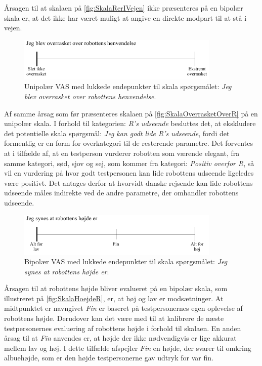 \noindent
%
Årsagen til at skalaen på \autoref{fig:SkalaRerIVejen} ikke præsenteres på en bipolær skala er, at det ikke har været muligt at angive en direkte modpart til at stå i vejen. 
%
\begin{figure}[H]
\centering
\includegraphics[width =\textwidth]{Figure/UdvalgteSkalaer/OverrasketOverR} 
\caption{Unipolær VAS med lukkede endepunkter til skala spørgsmålet: \textit{Jeg blev overrasket over robottens henvendelse}.}
\label{fig:SkalaOverrasketOverR}
\end{figure}
\noindent
%
Af samme årsag som før præsenteres skalaen på \autoref{fig:SkalaOverrasketOverR} på en unipolær skala. \blankline
%
I forhold til kategorien: \textit{R's udseende} besluttes det, at ekskludere det potentielle skala spørgsmål: \textit{Jeg kan godt lide R's udseende}, fordi det formentlig er en form for overkategori til de resterende parametre. Det forventes at i tilfælde af, at en testperson vurderer robotten som værende elegant, fra samme kategori, sød, sjov og sej, som kommer fra kategori: \textit{Positiv overfor R}, så vil en vurdering på hvor godt testpersonen kan lide robottens udseende ligeledes være positivt. Det antages derfor at hvorvidt danske rejsende kan lide robottens udseende måles indirekte ved de andre parametre, der omhandler robottens udseende.
%
\begin{figure}[H]
\centering
\includegraphics[width =\textwidth]{Figure/UdvalgteSkalaer/HoejdeR} 
\caption{Bipolær VAS med lukkede endepunkter til skala spørgsmålet: \textit{Jeg synes at robottens højde er}.}
\label{fig:SkalaHoejdeR}
\end{figure}
\noindent
%
Årsagen til at robottens højde bliver evalueret på en bipolær skala, som illustreret på \autoref{fig:SkalaHoejdeR}, er, at høj og lav er modsætninger. At midtpunktet er navngivet \textit{Fin} er baseret på testpersonernes egen oplevelse af robottens højde. Derudover kan det være med til at kalibrere de næste testpersonernes evaluering af robottens højde i forhold til skalaen. En anden årsag til at \textit{Fin} anvendes er, at højde der ikke nødvendigvis er lige akkurat mellem lav og høj. I dette tilfælde afspejler \textit{Fin} en højde, der svarer til omkring albuehøjde, som er den højde testpersonerne gav udtryk for var fin. 
